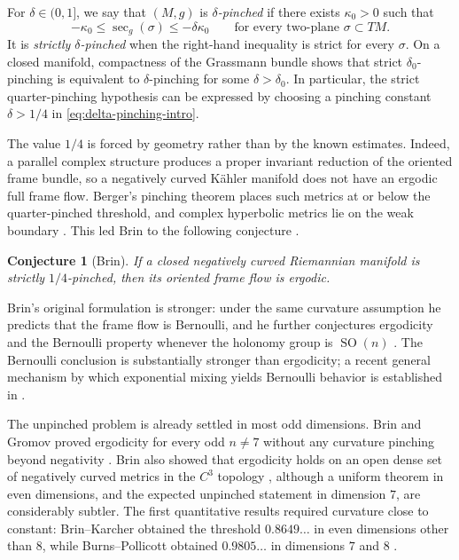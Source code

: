 \documentclass[reqno,11pt]{amsart}
\newtheorem{conjecture}[theorem]{Conjecture}
\theoremstyle{definition}
\newcommand{\SO}{\operatorname{SO}}
\newcommand{\secg}{\operatorname{sec}_{g}}
\begin{document}
For $\delta\in(0,1]$, we say that $(M,g)$ is \emph{$\delta$-pinched} if there
exists $\kappa_0>0$ such that
\begin{equation}\label{eq:delta-pinching-intro}
  -\kappa_0\leq\secg(\sigma)\leq-\delta\kappa_0
  \qquad\text{for every two-plane }\sigma\subset TM.
\end{equation}
It is \emph{strictly $\delta$-pinched} when the right-hand inequality is
strict for every $\sigma$.  On a closed manifold, compactness of the
Grassmann bundle shows that strict $\delta_0$-pinching is equivalent to
$\delta$-pinching for some $\delta>\delta_0$.  In particular, the strict
quarter-pinching hypothesis can be expressed by choosing a pinching
constant $\delta>1/4$ in \eqref{eq:delta-pinching-intro}.

The value $1/4$ is forced by geometry rather than by the known estimates.
Indeed, a parallel complex structure produces a proper invariant reduction
of the oriented frame bundle, so a negatively curved K\"ahler manifold does
not have an ergodic full frame flow.  Berger's pinching theorem places such
metrics at or below the quarter-pinched threshold, and complex hyperbolic
metrics lie on the weak boundary \cite{Berger60}.  This led Brin to the
following conjecture \cite[Conjecture~2.6]{Brin82}.

\begin{conjecture}[Brin]\label{conj:Brin}
If a closed negatively curved Riemannian manifold is strictly
$1/4$-pinched, then its oriented frame flow is ergodic.
\end{conjecture}

Brin's original formulation is stronger: under the same curvature
assumption he predicts that the frame flow is Bernoulli, and he further
conjectures ergodicity and the Bernoulli property whenever the holonomy group
is $\SO(n)$ \cite[Conjectures~2.6 and 2.9]{Brin82}.  The Bernoulli conclusion
is substantially stronger than ergodicity; a recent general mechanism by
which exponential mixing yields Bernoulli behavior is established in
\cite{DolgopyatKanigowskiRodriguezHertz24}.

The unpinched problem is already settled in most odd dimensions.  Brin and
Gromov proved ergodicity for every odd $n\neq7$ without any curvature
pinching beyond negativity \cite{BrinGromov80}.  Brin also showed that
ergodicity holds on an open dense set of negatively curved metrics in the
$C^3$ topology \cite[Section~5]{Brin82}, although a uniform theorem in even
dimensions, and the expected unpinched statement in dimension $7$, are
considerably subtler.  The first quantitative results required curvature
close to constant: Brin--Karcher obtained the threshold
$0.8649\ldots$ in even dimensions other than $8$, while
Burns--Pollicott obtained $0.9805\ldots$ in dimensions $7$ and $8$
\cite{BrinKarcher84,BurnsPollicott03}.
\end{document}
